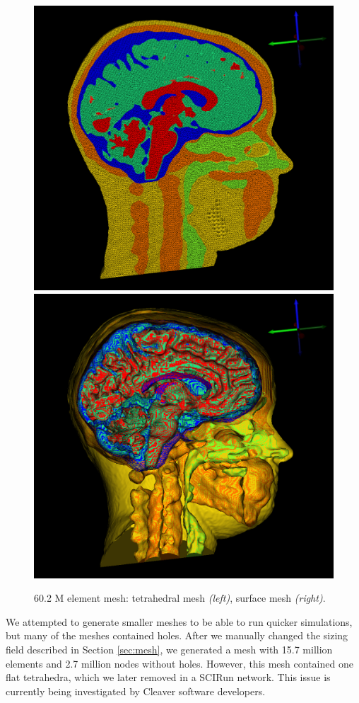 \begin{figure}[H]
\begin{center}
\includegraphics[width=.49\textwidth]{Figures/bigmesh_1}
\includegraphics[width=.49\textwidth]{Figures/bigmesh_surface}
\caption{60.2 M element mesh: tetrahedral mesh \textit{(left)}, surface mesh \textit{(right)}.}
\label{fig:bigmesh}
\end{center}
\end{figure}

We attempted to generate smaller meshes to be able to run quicker simulations, but many of the meshes contained holes. After we manually changed the sizing field described in Section \ref{sec:mesh}, we generated a mesh with 15.7 million elements and 2.7 million nodes without holes. However, this mesh contained one flat tetrahedra, which we later removed in a SCIRun network. This issue is currently being investigated by Cleaver software developers.

